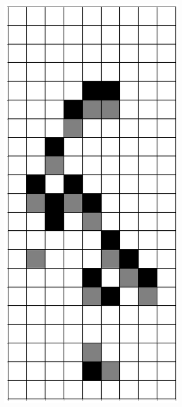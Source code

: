 \documentclass[12pt]{article}
\numberwithin{figure}{section} %
\begin{document}
\begin{figure}[H]
\begin{subfigure}{0.19\textwidth}
     \subcaption{}
   \end{subfigure}
     \begin{subfigure}{0.19\textwidth}
     \centering
     \includegraphics[width=\linewidth]{Section4/25.1}

\end{subfigure}
\end{figure}
\end{document}
